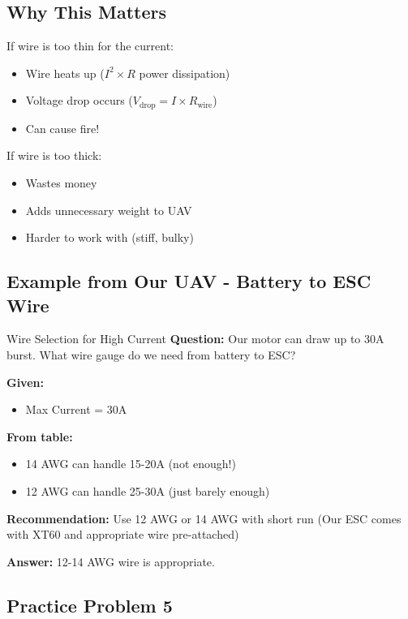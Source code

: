 \documentclass[11pt,letterpaper]{article}
\begin{document}
\subsection{Why This Matters}

If wire is too thin for the current:
\begin{itemize}
  \item Wire heats up ($I^2 \times R$ power dissipation)
  \item Voltage drop occurs ($V_{\text{drop}} = I \times R_{\text{wire}}$)
  \item Can cause fire!
\end{itemize}

If wire is too thick:
\begin{itemize}
  \item Wastes money
  \item Adds unnecessary weight to UAV
  \item Harder to work with (stiff, bulky)
\end{itemize}

\subsection{Example from Our UAV - Battery to ESC Wire}

\begin{examplebox}{Wire Selection for High Current}
\textbf{Question:} Our motor can draw up to 30A burst. What wire gauge do we need from battery to ESC?

\textbf{Given:}
\begin{itemize}
  \item Max Current = 30A
\end{itemize}

\textbf{From table:}
\begin{itemize}
  \item 14 AWG can handle 15-20A (not enough!)
  \item 12 AWG can handle 25-30A (just barely enough)
\end{itemize}

\textbf{Recommendation:} Use 12 AWG or 14 AWG with short run (Our ESC comes with XT60 and appropriate wire pre-attached)

\textbf{Answer:} 12-14 AWG wire is appropriate.
\end{examplebox}

\subsection{Practice Problem 5}
\end{document}
